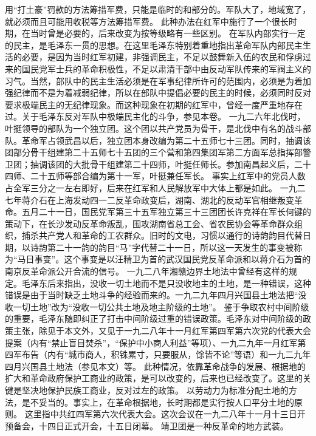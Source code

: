 \begin{maonote}
用“打土豪”罚款的方法筹措军费，只能是临时的和部分的。军队大了，地域宽了，就必须而且可能用收税等方法筹措军费。
此种办法在红军中施行了一个很长时期，在当时曾是必要的，后来改变为按等级略有一些区别。
在军队内部实行一定的民主，是毛泽东一贯的思想。在这里毛泽东特别着重地指出革命军队内部民主生活的必要，是因为当时红军初建，非强调民主，不足以鼓舞新入伍的农民和俘虏过来的国民党军士兵的革命积极性，不足以肃清干部中由反动军队传来的军阀主义的习气。当然，部队中的民主生活必须是在军事纪律所许可的范围内，必须是为着加强纪律而不是为着减弱纪律，所以在部队中提倡必要的民主的时候，必须同时反对要求极端民主的无纪律现象。而这种现象在初期的红军中，曾经一度严重地存在过。关于毛泽东反对军队中极端民主化的斗争，参见本卷。
一九二六年北伐时，叶挺领导的部队为一个独立团。这个团以共产党员为骨干，是北伐中有名的战斗部队。革命军占领武昌以后，独立团本身改编为第二十五师七十三团。同时，抽调该团部分骨干组建第二十五师七十五团的三个营和第四集团军第二方面军总指挥部警卫团；抽调该团的大批骨干组建第二十四师，叶挺任师长。参加南昌起义后，二十四师、二十五师等部合编为第十一军，叶挺兼任军长。
事实上红军中的党员人数占全军三分之一左右即好，后来在红军和人民解放军中大体上都是如此。
一九二七年蒋介石在上海发动四一二反革命政变后，湖南、湖北的反动军官相继叛变革命。五月二十一日，国民党军第三十五军独立第三十三团团长许克祥在军长何键的策动下，在长沙发动反革命叛乱，围攻湖南省总工会、省农民协会等革命群众组织，捕杀共产党人和革命的工农群众。旧时的文电，习惯以通行的诗韵韵目代替日期，以诗韵第二十一韵的韵目“马”字代替二十一日，所以这一天发生的事变被称为“马日事变”。这个事变是以汪精卫为首的武汉国民党反革命派和以蒋介石为首的南京反革命派公开合流的信号。
一九二八年湘赣边界土地法中曾经有这样的规定。毛泽东后来指出，没收一切土地而不是只没收地主的土地，是一种错误，这种错误是由于当时缺乏土地斗争的经验而来的。一九二九年四月兴国县土地法把“没收一切土地”改为“没收一切公共土地及地主阶级的土地”。
鉴于争取农村中间阶级的重要，毛泽东随即纠正了打击中间阶级过重的错误政策。毛泽东对中间阶级的政策主张，除见于本文外，又见于一九二八年十一月红军第四军第六次党的代表大会提案（内有“禁止盲目焚杀”，“保护中小商人利益”等项）、一九二九年一月红军第四军布告（内有“城市商人，积铢累寸，只要服从，馀皆不论”等语）和一九二九年四月兴国县土地法（参见本文）等。
此种情况，依靠革命战争的发展、根据地的扩大和革命政府保护工商业的政策，是可以改变的，后来也已经改变了。这里的关键是坚决地保护民族工商业，反对过左的政策。
以劳动力为标准分配土地的方法，是不妥当的。事实上，在革命根据地，长时期都是实行按人口平分土地的原则。
这里指中共红四军第六次代表大会。这次会议在一九二八年十一月十三日开预备会，十四日正式开会，十五日闭幕。
靖卫团是一种反革命的地方武装。
\end{maonote}
